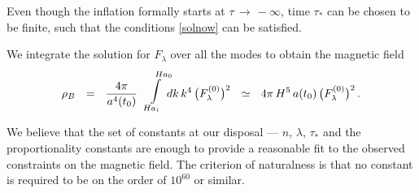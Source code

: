 \documentclass[12pt]{article}
\begin{document}
	Even though the inflation formally starts at $ \tau \,\to\, -\infty $, time $ \tau_* $ can be chosen to be finite, 
	such that the conditions \eqref{solnow} can be satisfied.

	We integrate the solution for $ F_\lambda $ over all the modes to obtain the magnetic field
\[
	\rho_B    ~~=~~    \frac{4\pi}{a^4(t_0)}\, \!\!
			{ \lower 2.8ex \hbox{    $   \stackrel{\displaystyle \stackrel{\;\;\;\;\;\; H a_0}{\int}}
							{\scriptstyle \!\!\!\!\!\! H a_i}  $    }    }
			\!\!\!\!\!\! \, dk\, k^4\, \big( F_{\lambda}^{(0)} \big)^2
			~~\simeq~~ 4\pi\, H^5\, a(t_0)\, \big( F_{\lambda}^{(0)} \big)^2\,.
\]

	We believe that the set of constants at our disposal --- $ n $, $ \lambda $, $ \tau_* $ and the proportionality constants
	are enough to provide a reasonable fit to the observed constraints on the magnetic field.
	The criterion of naturalness is that no constant is required to be on the order of $ 10^{60} $ or similar.
\end{document}
